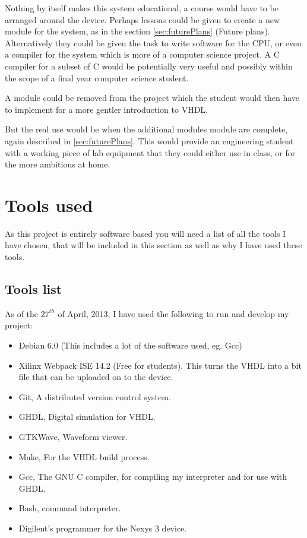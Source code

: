 \documentclass	[a4paper, 10pt]	{article}
\begin{document}
    Nothing by itself makes this system educational, a course would have to be
    arranged around the device. Perhaps lessons could be given to create a new module
    for the system, as in the section \ref{sec:futurePlans} (Future plans). Alternatively
    they could be given the task to write software for the CPU, or even a compiler
    for the system which is more of a computer science project. A C compiler for a
    subset of C would be potentially very useful and possibly within the scope of
    a final year computer science student.

    A module could be removed from the project which the student would then have to
    implement for a more gentler introduction to VHDL. 

    But the real use would be when the additional modules module are complete, again
    described in \ref{sec:futurePlans}. This would provide an engineering student
    with a working piece of lab equipment that they could either use in class, or for
    the more ambitious at home.

  \section{Tools used}
  
  As this project is entirely software based you will need a list of all the tools
  I have chosen, that will be included in this section as well as why I have used
  these tools.

    \subsection{Tools list}

    As of the $27^{th}$ of April, 2013, I have used the following to run and develop
    my project:

    \begin{itemize}
      \item Debian 6.0 (This includes a lot of the software used, eg. Gcc)
      \item Xilinx Webpack ISE 14.2 (Free for students). This turns the
      VHDL into a bit file that can be uploaded on to the device.
      \item Git, A distributed version control system.
      \item GHDL, Digital simulation for VHDL.
      \item GTKWave, Waveform viewer.
      \item Make, For the VHDL build process.
      \item Gcc, The GNU C compiler, for compiling my interpreter and for
      use with GHDL.
      \item Bash, command interpreter.
      \item Digilent's programmer for the Nexys 3 device.
    \end{itemize}
\end{document}
